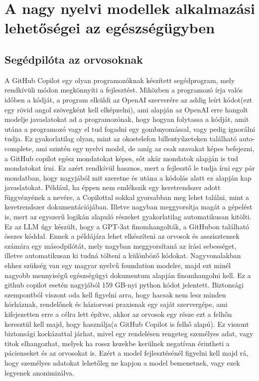 \documentclass{article}
\begin{document}
\section{A nagy nyelvi modellek alkalmazási lehetőségei az egészségügyben
}
\begin{multicols}{2}
\subsection{Segédpilóta az orvosoknak}
A GitHub Copilot egy olyan programozóknak készített segédprogram, mely rendkívüli módon megkönnyíti a fejlesztést. Miközben a programozó írja valós időben a kódját, a program elküldi az OpenAI szerverére az addig leírt kódot(ezt egy rövid angol szövegként kell elképzelni), ami alapján az OpenAI erre hangolt modelje javaslatokat ad a programozónak, hogy hogyan folytassa a kódját, amit utána a programozó vagy el tud fogadni egy gombnyomással, vagy pedig ignorálni tudja. Ez gyakorlatilag olyan, mint az okostelefon billentyűzeteken található auto-complete, ami szintén egy nyelvi model, de amíg az csak szavakat képes befejezni, a GitHub copilot egész mondatokat képes, sőt akár mondatok alapján is tud mondatokat írni. Ez azért rendkívül hasznos, mert a fejlesztő le tudja írni egy pár mondatban, hogy nagyjából mit szeretne és utána a kódolás alatt ez alapján kap javaslatokat. Például, ha éppen nem emlékszik egy keretrendszer adott függvényének a nevére, a Copilottal sokkal gyorsabban meg lehet találni, mint a keretrendszer dokumentációjában. Illetve nagyban meggyorsítja magát a gépelést is, mert az egyszerű logikán alapuló részeket gyakorlatilag automatikusan kitölti.
Ez az LLM úgy készült, hogy a GPT-3at finomhangolták, a GitHubon található összes kóddal.
Ennek a példájára lehet elkészíteni az orvosok és asszisztensek számára egy másodpilótát, mely nagyban meggyorsítaná az írási sebességet, illetve automatikusan ki tudná tölteni a különböző kódokat. Nagyvonalakban ehhez szükség van egy magyar nyelvű foundation modelre, majd ezt minél nagyobb mennyiségű egészségügyi dokumentum alapján finomhangolni kell. Ez a github copilot esetén nagyjából 159 GB-nyi python kódot jelentett.
Biztonsági szempontból viszont oda kell figyelni arra, hogy hacsak nem lesz minden kórháznak, rendelőnek és háziorvosi praxisnak egy saját szervergépe, ami kifejezetten erre a célra lett építve, akkor az orvosok egy része ezt a felhőn keresztül kell majd, hogy használja(a GitHub Copilot is felhő alapú). Ez viszont biztonsági kockázattal járhat, mivel egy rendelésen rengeteg személyes adat, vagy titok elhangozhat, melyek ha rossz kezekbe kerülnek negatívan érintheti a pácienseket és az orvosokat is. Ezért a model fejlesztésénél figyelni kell majd rá, hogy személyes adatokat lehetőleg ne kapjon a model bemenetnek, vagy ezek legyenek anonimizálva.


\end{multicols}
\end{document}
